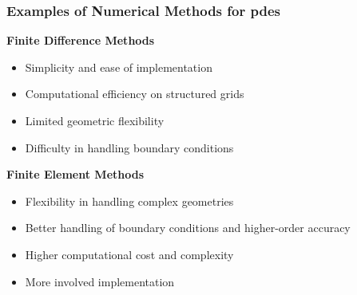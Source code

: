 \begin{frame}
    \frametitle{Examples of Numerical Methods for \acrshort{pdes}}

    \vspace*{\fill}
    \begin{multicols}{2}

        \begin{center}
            {\color{\accentcolor} \Large \textbf{Finite Difference Methods}}
            \vspace*{0.5cm}

            \begin{minipage}{0.4\textwidth}
                \begin{itemize}
                    \color{\procolor}
                    \item Simplicity and ease of implementation
                    \item Computational efficiency on structured grids
                \end{itemize}
    
                \begin{itemize}
                    \color{\concolor}
                    \item Limited geometric flexibility
                    \item Difficulty in handling boundary conditions
                \end{itemize}
            \end{minipage}
        \end{center}

        \begin{center}
            {\color{\accentcolor} \Large \textbf{Finite Element Methods}}
            \vspace*{0.5cm}

            \begin{minipage}{0.4\textwidth}
                \begin{itemize}
                    \color{\procolor}
                    \item Flexibility in handling complex geometries
                    \item Better handling of boundary conditions and higher-order accuracy
                \end{itemize}

                \begin{itemize}
                    \color{\concolor}
                    \item Higher computational cost and complexity
                    \item More involved implementation
                \end{itemize}
            \end{minipage}
        \end{center}
    \end{multicols}
    \vspace*{\fill}
    
\end{frame}


    
